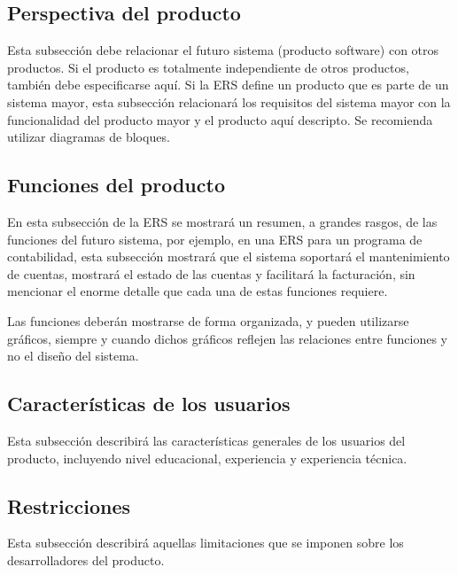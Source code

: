 \documentclass[12pt,a4paper, twosite]{article}
\begin{document}
\subsection{Perspectiva del producto}
\label{sec:org24980a8}

Esta subsección debe relacionar el futuro sistema (producto
software) con otros productos. Si el producto es totalmente
independiente de otros productos, también debe especificarse
aquí. Si la ERS define un producto que es parte de un sistema mayor,
esta subsección relacionará los requisitos del sistema mayor con la
funcionalidad del producto mayor y el producto aquí descripto. Se
recomienda utilizar diagramas de bloques.


\subsection{Funciones del producto}
\label{sec:orgaf51da6}

En esta subsección de la ERS se mostrará un resumen, a grandes
rasgos, de las funciones del futuro sistema, por ejemplo, en una ERS
para un programa de contabilidad, esta subsección mostrará que el
sistema soportará el mantenimiento de cuentas, mostrará el estado de
las cuentas y facilitará la facturación, sin mencionar el enorme
detalle que cada una de estas funciones requiere.

Las funciones deberán mostrarse de forma organizada, y pueden
utilizarse gráficos, siempre y cuando dichos gráficos reflejen las
relaciones entre funciones y no el diseño del sistema.


\subsection{Características de los usuarios}
\label{sec:orga40b0ee}

Esta subsección describirá las características generales de los
usuarios del producto, incluyendo nivel educacional, experiencia y
experiencia técnica.


\subsection{Restricciones}
\label{sec:org5ca5790}

Esta subsección describirá aquellas limitaciones que se imponen
sobre los desarrolladores del producto.
\end{document}
